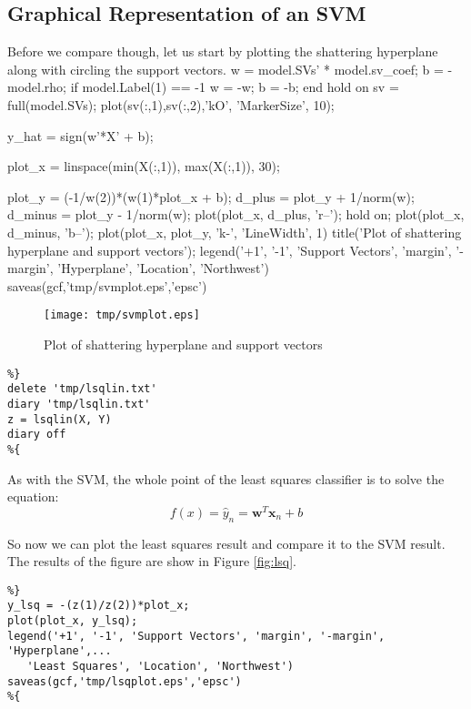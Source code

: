 \documentclass[11pt, twoside]{article}   	%
\newenvironment{matlab}{\comment}{\endcomment}
\begin{document}
\subsection{Graphical Representation of an SVM}

Before we compare though, let us start by plotting the shattering
hyperplane along with circling the support vectors. 
\begin{matlab}
w = model.SVs' * model.sv_coef;
b = -model.rho;
if model.Label(1) == -1
  w = -w;
  b = -b;
end
hold on 
sv = full(model.SVs);
plot(sv(:,1),sv(:,2),'kO', 'MarkerSize', 10);

y_hat = sign(w'*X' + b);

plot_x = linspace(min(X(:,1)), max(X(:,1)), 30);

plot_y = (-1/w(2))*(w(1)*plot_x + b);
d_plus = plot_y + 1/norm(w); 
d_minus = plot_y - 1/norm(w);
plot(plot_x, d_plus, 'r--'); 
hold on; 
plot(plot_x, d_minus, 'b--'); 
plot(plot_x, plot_y, 'k-', 'LineWidth', 1)
title('Plot of shattering hyperplane and support vectors'); 
legend('+1', '-1', 'Support Vectors', 'margin', '-margin', 'Hyperplane', 'Location', 'Northwest')
saveas(gcf,'tmp/svmplot.eps','epsc')

\end{matlab}

\begin{figure}[h]
\centering
\texttt{[image: tmp/svmplot.eps]}
\caption{Plot of shattering hyperplane and support vectors}
\label{fig:svm} 
\end{figure}

\begin{lstlisting}
%}
delete 'tmp/lsqlin.txt'
diary 'tmp/lsqlin.txt'
z = lsqlin(X, Y)  
diary off
%{
\end{lstlisting}

\color{lightgray}
\color{black}

As with the SVM, the whole point of the least squares classifier
is to solve the equation: 
\begin{equation}
f(x) = \hat{y}_n = \bm{w}^T\bm{x}_n + b
\end{equation}

So now we can plot the least squares result and compare it to the SVM
result. The results of the figure are show in Figure \ref{fig:lsq}. 
\begin{lstlisting}
%}
y_lsq = -(z(1)/z(2))*plot_x; 
plot(plot_x, y_lsq); 
legend('+1', '-1', 'Support Vectors', 'margin', '-margin', 'Hyperplane',...
   'Least Squares', 'Location', 'Northwest')
saveas(gcf,'tmp/lsqplot.eps','epsc')
%{
\end{lstlisting}
\end{document}
